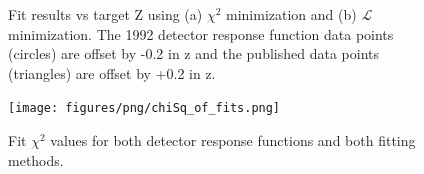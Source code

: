 \begin{figure}[h]
  \centering
  \hfill
  \caption{Fit results vs target Z using (a) $\chi^2$ minimization and (b) $\mathcal{L}$ minimization.
    The 1992 detector response function data points (circles) are offset by -0.2 in z and the published data points (triangles)
    are offset by +0.2 in z.
  }
\end{figure}

\begin{figure}[h]
  \centering
  \texttt{[image: figures/png/chiSq\_of\_fits.png]}
  \caption{Fit $\chi^2$ values for both detector response functions and both fitting methods. }
  \label{fig:ChiSqOfFits}
\end{figure}


